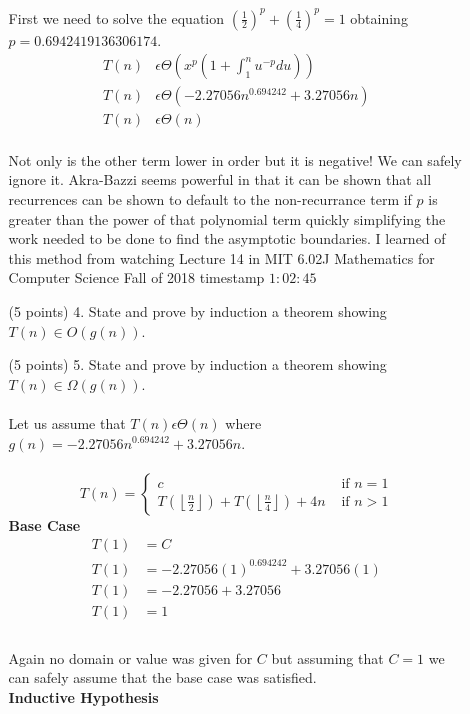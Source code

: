 \documentclass[paper=a4,fontsize=11pt]{article}
\begin{document}
\begin{enumerate}
\begin{enumerate}
First we need to solve the equation $(\frac{1}{2})^p+(\frac{1}{4})^p=1$ obtaining $p=0.6942419136306174$.\\
\begin{align*}
T(n) &\epsilon \Theta(x^p(1+\int_{1}^{n}{u^{-p}du}))\\
T(n) &\epsilon \Theta(-2.27056n^{0.694242}+3.27056n)\\
T(n) &\epsilon \Theta(n)
\end{align*}\\
Not only is the other term lower in order but it is negative! We can safely ignore it. Akra-Bazzi seems powerful in that it can be shown that all recurrences can be shown to default to the non-recurrance term if $p$ is greater than the power of that polynomial term quickly simplifying the work needed to be done to find the asymptotic boundaries. I learned of this method from watching Lecture 14 in MIT 6.02J Mathematics for Computer Science Fall of 2018 timestamp $1:02:45$\\
\item [(5 points) 4.] State and prove by induction a theorem showing $T (n) \in O(g(n))$.
\item [(5 points) 5.] State and prove by induction a theorem showing $T (n) \in \Omega(g(n))$.\\\\
Let us assume that $T(n) \epsilon \Theta(n)$ where $g(n)=-2.27056n^{0.694242}+3.27056n$.\\\\
\[
T(n) = \left\{
\begin{array}{cl}
c & \textrm{ if } n = 1\\
T(\left\lfloor\frac{n}{2}\right\rfloor) + T(\left\lfloor\frac{n}{4}\right\rfloor) + 4n & \textrm{ if } n > 1
\end{array}
\right.
\]
\textbf{Base Case}\\
\begin{align*}
T(1) &= C\\
T(1) &= -2.27056(1)^{0.694242}+3.27056(1)\\
T(1) &= -2.27056+3.27056\\
T(1) &= 1\\
\end{align*}\\
Again no domain or value was given for $C$ but assuming that $C=1$ we can safely assume that the base case was satisfied.\\
\textbf{Inductive Hypothesis}\\
\begin{align*}

\end{align*}
\end{enumerate}
\end{enumerate}
\end{document}
